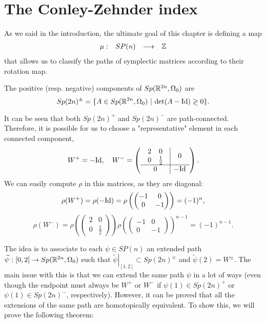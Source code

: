 \section{The Conley-Zehnder index}

As we said in the introduction, the ultimate goal of this chapter is defining a map
\[\begin{array}{rccc} \mu : & SP(n) & \longrightarrow & \mathbb{Z} \end{array}\]
that allows us to classify the paths of symplectic matrices according to their rotation map.

\begin{deff} The positive (resp. negative) components of $Sp(\mathbb{R}^{2n},\Omega_0)$ are
\[Sp(2n)^{\pm} = \{A \in Sp(\R^{2n},\Omega_0) \ | \ \text{det}(A - \text{Id}) \gtrless 0 \} .\]
\end{deff}

It can be seen that both $Sp(2n)^+$ and $Sp(2n)^-$ are path-connected. Therefore, it is possible for us to choose a "representative" element in each connected component,
\[W^+ = - \text{Id}, \ \ \ W^- = \left( \begin{array}{c|c} \begin{array}{cc} 2 & 0 \\ 0 & \frac12 \end{array} & 0 \\ \hline 0 & - \text{Id} \end{array} \right) .\]
We can easily compute $\rho$ in this matrices, as they are diagonal:
\[\rho(W^+) = \rho(- \text{Id}) = \rho\left( \begin{pmatrix} -1 & 0 \\ 0 & -1 \end{pmatrix} \right) = (-1)^n ,\]
\[\rho(W^-) = \rho\left( \begin{pmatrix} 2 & 0 \\ 0 & \frac12 \end{pmatrix} \right) \rho\left(\begin{pmatrix}-1&0\\0&-1\end{pmatrix}\right)^{n-1} = (-1)^{n-1} .\]

The idea is to associate to each $\psi \in SP(n)$ an extended path $\widetilde{\psi} : [0,2] \rightarrow Sp(\mathbb{R}^{2n},\Omega_0)$ such that $\left. \widetilde{\psi} \right|_{[1,2]} \subset Sp(2n)^{\pm}$ and $\widetilde{\psi}(2) = W^{\pm}$. The main issue with this is that we can extend the same path $\psi$ in a lot of ways (even though the endpoint must always be $W^+$ or $W^-$ if $\psi(1) \in Sp(2n)^+$ or $\psi(1) \in Sp(2n)^-$, respectively). However, it can be proved that all the extensions of the same path are homotopically equivalent. To show this, we will prove the following theorem:

